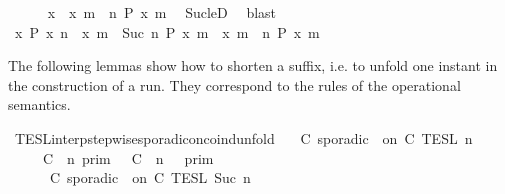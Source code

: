 \begin{isabellebody}
\ \ \ \ \isamarkupfalse%
\ {\isacartoucheopen}x\ {\isasymin}\ {\isacharbraceleft}x{\isachardot}\ {\isasymexists}m\ {\isasymge}\ n{\isachardot}\ P\ x\ m{\isacharbraceright}{\isacartoucheclose}\ \isamarkupfalse%
\ Suc{\isacharunderscore}leD\ \isamarkupfalse%
\ blast\isanewline
\ \ \isacommand{{\isacharbraceright}}\isamarkupfalse%
\ \isamarkupfalse%
\ {\isacartoucheopen}{\isacharbraceleft}x{\isachardot}\ P\ x\ n{\isacharbraceright}\ {\isasymunion}\ {\isacharbraceleft}x{\isachardot}\ {\isasymexists}m\ {\isasymge}\ Suc\ n{\isachardot}\ P\ x\ m{\isacharbraceright}\ {\isasymsubseteq}\ {\isacharbraceleft}x{\isachardot}\ {\isasymexists}m\ {\isasymge}\ n{\isachardot}\ P\ x\ m{\isacharbraceright}{\isacartoucheclose}\ \isacommand{{\isachardot}{\isachardot}}\isamarkupfalse%
\isanewline
{}\isamarkupfalse%
%
\endisatagproof
{\isafoldproof}%
%
\isadelimproof
%
\endisadelimproof
%
\isadelimdocument
%
\endisadelimdocument
%
\isatagdocument
%
\isamarkuptrue%
%
\endisatagdocument
{\isafolddocument}%
%
\isadelimdocument
%
\endisadelimdocument
%
\begin{isamarkuptext}%
The following lemmas show how  to shorten a suffix, i.e. to unfold one instant 
  in the construction of a run. They correspond to the rules of the operational 
  semantics.%
\end{isamarkuptext}\isamarkuptrue%
\isamarkupfalse%
\ TESL{\isacharunderscore}interp{\isacharunderscore}stepwise{\isacharunderscore}sporadicon{\isacharunderscore}coind{\isacharunderscore}unfold{\isacharcolon}\isanewline
\ \ {\isacartoucheopen}{\isasymlbrakk}\ C\ sporadic\ {\isasymtau}\ on\ C\ {\isasymrbrakk}\isactrlsub T\isactrlsub E\isactrlsub S\isactrlsub L\isactrlbsup {\isasymge}\ n\isactrlesup \ {\isacharequal}\isanewline
\ \ \ \ {\isasymlbrakk}\ C\ {\isasymUp}\ n\ {\isasymrbrakk}\isactrlsub p\isactrlsub r\isactrlsub i\isactrlsub m\ {\isasyminter}\ {\isasymlbrakk}\ C\ {\isasymDown}\ n\ {\isacharat}\ {\isasymtau}\ {\isasymrbrakk}\isactrlsub p\isactrlsub r\isactrlsub i\isactrlsub m\ \ \ \ \ \ \ \ %
\isanewline
\ \ \ \ {\isasymunion}\ {\isasymlbrakk}\ C\ sporadic\ {\isasymtau}\ on\ C\ {\isasymrbrakk}\isactrlsub T\isactrlsub E\isactrlsub S\isactrlsub L\isactrlbsup {\isasymge}\ Suc\ n\isactrlesup {\isacartoucheclose}\ \ \ %

\end{isabellebody}
